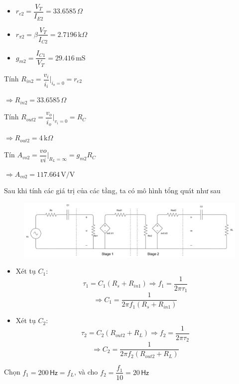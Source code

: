\begin{itemize}[label=-]
	\begin{itemize}[label=+, leftmargin=2cm]
		\item $r_{e2} = \dfrac{V_{T}}{I_{E2}} = 33.6585\,\Omega$
		\item $r_{\pi2} = \beta\dfrac{V_{T}}{I_{C2}} = 2.7196\,\text{k}\Omega$
		\item $g_{m2} = \dfrac{I_{C1}}{V_{T}} = 29.416\,\text{mS}$
	\end{itemize}
	
	Tính $R_{in2} = \dfrac{v_{i}}{i_{i}}\bigg|_{i_{o} = 0} = r_{e2}$
	
	$\Rightarrow R_{in2} = 33.6585\,\Omega$
	
	Tính $R_{out2} = \dfrac{v_{o}}{i_{o}}\bigg|_{v_{i} = 0} = R_{C}$
	
	$\Rightarrow R_{out2} = 4\,\text{k}\Omega$
	
	Tín $A_{vo2} = \dfrac{vo}{vi}\bigg|_{R_{L} = \infty} = g_{m2} R_{C}$
	
	$\Rightarrow A_{vo2} = 117.664\,\text{V/V}$
\end{itemize}

Sau khi tính các giá trị của các tầng, ta có mô hình tổng quát như sau

\begin{figure}[H]
	\centering
	\includegraphics[width=\linewidth]{./my-chapters/my-diagrams/Question5/c_tonghopmach.png}
\end{figure}

\begin{itemize}[label=-]
	\item Xét tụ $C_{1}$:
	\[ \tau_1 = C_{1} \left( R_{s} + R_{in1} \right) \Rightarrow f_{1} = \dfrac{1}{2\pi \tau_1} \]
	\[ \Rightarrow C_{1} = \dfrac{1}{2\pi f_{1} \left( R_{s} + R_{in1} \right)} \]
	
	\item Xét tụ $C_{2}$:
	\[ \tau_{2} = C_{2} \left( R_{out2} + R_{L}\right) \Rightarrow f_{2} = \dfrac{1}{2\pi \tau_{2}}\]
	\[ \Rightarrow C_{2} = \dfrac{1}{2\pi f_{2} \left( R_{out2} + R_{L}\right)}\]
\end{itemize}

Chọn $f_{1} = 200\,\textsf{Hz} = f_{L}$, và cho $f_{2} = \dfrac{f_{1}}{10} = 20\,\textsf{Hz}$

